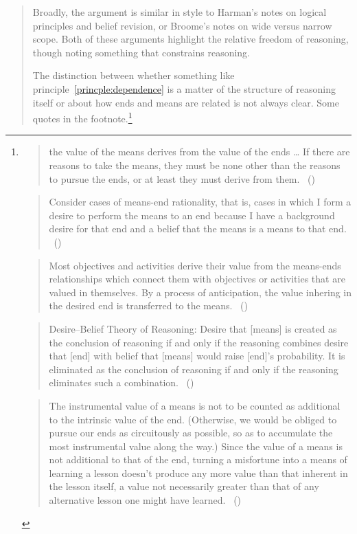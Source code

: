 \documentclass[10pt]{article}
\begin{document}
\begin{quote}
  Broadly, the argument is similar in style to Harman's notes on logical principles and belief revision, or Broome's notes on wide versus narrow scope.
  Both of these arguments highlight the relative freedom of reasoning, though noting something that constrains reasoning.

  The distinction between whether something like principle~\ref{princple:dependence} is a matter of the structure of reasoning itself or about how ends and means are related is not always clear.
  Some quotes in the footnote.\footnote{
  \begin{quote}
    the value of the means derives from the value of the ends \dots
    If there are reasons to take the means, they must be none other than the reasons to pursue the ends, or at least they must derive from them.\nolinebreak
  \mbox{ }\hfill(\cite[2]{Raz:2005aa})
\end{quote}

\begin{quote}
  Consider cases of means-end rationality, that is, cases in which I form a desire to perform the means to an end because I have a background desire for that end and a belief that the means is a means to that end.\nolinebreak
  \mbox{ }\hfill(\cite[84]{Smith:2004aa})
\end{quote}

\begin{quote}
  Most objectives and activities derive their value from the means-ends relationships which connect them with objectives or activities that are valued in themselves.
  By a process of anticipation, the value inhering in the desired end is transferred to the means.\nolinebreak
  \mbox{ }\hfill(\cite[61]{Simon:1997aa})
\end{quote}

\begin{quote}
  Desire–Belief Theory of Reasoning: Desire that [means] is created as the conclusion of reasoning if and only if the reasoning combines desire that [end] with belief that [means] would raise [end]'s probability.
  It is eliminated as the conclusion of reasoning if and only if the reasoning eliminates such a combination.\nolinebreak
  \mbox{ }\hfill(\cite[2]{Sinhababu:2017aa})
\end{quote}

\begin{quote}
  The instrumental value of a means is not to be counted as additional to the intrinsic value of the end.
  (Otherwise, we would be obliged to pursue our ends as circuitously as possible, so as to accumulate the most instrumental value along the way.)
  Since the value of a means is not additional to that of the end, turning a misfortune into a means of learning a lesson doesn’t produce any more value than that inherent in the lesson itself, a value not necessarily greater than that of any alternative lesson one might have learned.\nolinebreak
  \mbox{ }\hfill(\cite[65]{Velleman:2000ab})
\end{quote}

}
\end{quote}
\end{document}
